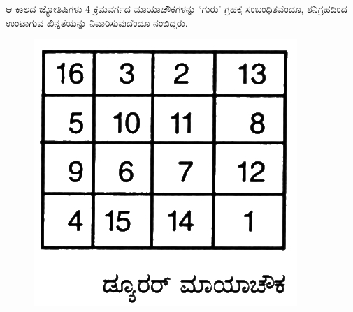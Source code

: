 ಆ ಕಾಲದ ಜ್ಯೋತಿಷಿಗಳು 4 ಕ್ರಮವರ್ಗದ ಮಾಯಾಚೌಕಗಳನ್ನು ‘ಗುರು’ ಗ್ರಹಕ್ಕೆ ಸಂಬಂಧಿತವೆಂದೂ, ಶನಿಗ್ರಹದಿಂದ ಉಂಟಾಗುವ ಖಿನ್ನತೆಯನ್ನು ನಿವಾರಿಸುವುದೆಂದೂ ನಂಬಿದ್ದರು.
\begin{figure}[h]
\includegraphics{src/figures/chap4/fig4.15.jpg}
\end{figure}
